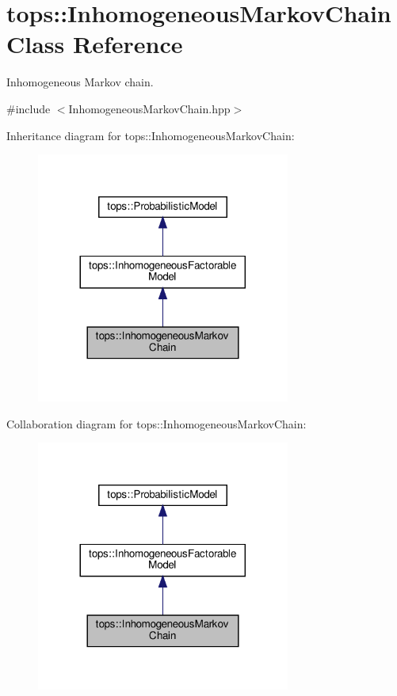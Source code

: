 \hypertarget{classtops_1_1InhomogeneousMarkovChain}{}\section{tops\+:\+:Inhomogeneous\+Markov\+Chain Class Reference}
\label{classtops_1_1InhomogeneousMarkovChain}


Inhomogeneous Markov chain.  




{\ttfamily \#include $<$Inhomogeneous\+Markov\+Chain.\+hpp$>$}



Inheritance diagram for tops\+:\+:Inhomogeneous\+Markov\+Chain\+:
\nopagebreak
\begin{figure}[H]
\begin{center}
\leavevmode
\includegraphics[width=236pt]{classtops_1_1InhomogeneousMarkovChain__inherit__graph}
\end{center}
\end{figure}


Collaboration diagram for tops\+:\+:Inhomogeneous\+Markov\+Chain\+:
\nopagebreak
\begin{figure}[H]
\begin{center}
\leavevmode
\includegraphics[width=236pt]{classtops_1_1InhomogeneousMarkovChain__coll__graph}
\end{center}
\end{figure}
